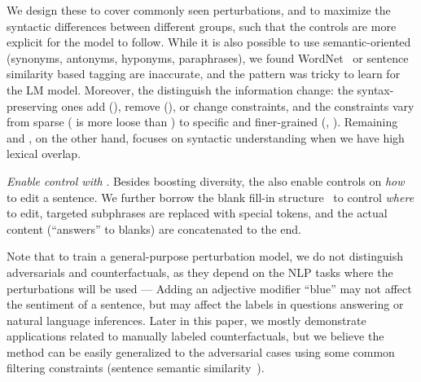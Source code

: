 We design these \tagstrs to cover commonly seen perturbations, and to maximize the syntactic differences between different groups, such that the controls are more explicit for the model to follow.
While it is also possible to use semantic-oriented \tagstrs (synonyms, antonyms, hyponyms, paraphrases), we found WordNet~\cite{miller1998wordnet} or sentence similarity based tagging are inaccurate, and the pattern was tricky to learn for the LM model.
Moreover, the \tagstrs distinguish the information change: the syntax-preserving ones add (), remove (), or change constraints, and the constraints vary from sparse ( is more loose than ) to specific and finer-grained (, ).
Remaining  and , on the other hand, focuses on syntactic understanding when we have high lexical overlap.


\emph{Enable control with \BLANK}.
Besides boosting diversity, the \tagstrs also enable controls on \emph{how} to edit a sentence.
We further borrow the blank fill-in structure~\cite{donahue2020enabling} to control \emph{where} to edit, \ie targeted subphrases are replaced with special \BLANK tokens, and the actual content (``answers'' to blanks) are concatenated to the end. 

Note that to train a general-purpose perturbation model, we do not distinguish adversarials and counterfactuals, as they depend on the NLP tasks where the perturbations will be used --- Adding an adjective modifier ``blue'' may not affect the sentiment of a sentence, but may affect the labels in questions answering or natural language inferences.
Later in this paper, we mostly demonstrate applications related to manually labeled counterfactuals, but we believe the method can be easily generalized to the adversarial cases using some common filtering constraints (\eg sentence semantic similarity~\cite{morris2020textattack}).


